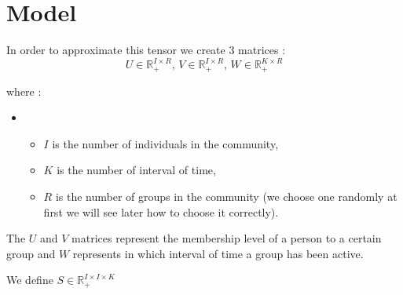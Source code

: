 \documentclass{article}
\begin{document}
\section{Model}

In order to approximate this tensor we create 3 matrices :
\[
    U \in \mathbb{R}_+^{I \times R}, \,
    V \in \mathbb{R}_+^{I \times R}, \,
    W \in \mathbb{R}_+^{K \times R}
\]

where :
\begin{itemize}
    \item[]
    \begin{itemize}
        \item $I$ is the number of individuals in the community,
        \item $K$ is the number of interval of time,
        \item $R$ is the number of groups in the community (we choose one randomly at first we will see later how to choose it correctly).
    \end{itemize}
\end{itemize}

The $U$ and $V$ matrices represent the membership level of a person to a certain group
and $W$ represents in which interval of time a group has been active.




We define $S \in \mathbb{R}_+^{I \times I \times K}$
\end{document}
